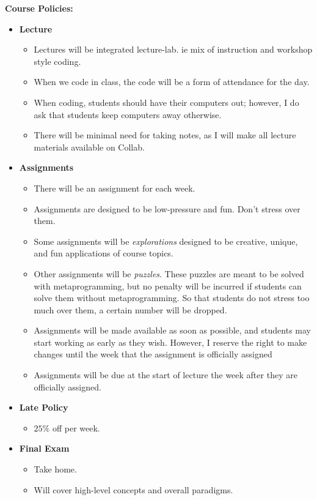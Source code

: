 \documentclass[11pt]{article}
\begin{document}
\textbf {\large Course Policies:}
\begin{itemize}
	\item \textbf {Lecture}
		\begin{itemize}
			\item Lectures will be integrated lecture-lab. ie mix of instruction and workshop style coding. 
			\item When we code in class, the code will be a form of attendance for the day.
			\item When coding, students should have their computers out; however, I do ask that students keep computers away otherwise. 
			\item There will be minimal need for taking notes, as I will make all lecture materials available on Collab.
		\end{itemize}
		\item \textbf {Assignments}
		\begin{itemize}
			\item There will be an assignment for each week. 
			\item Assignments are designed to be low-pressure and fun. Don't stress over them.
			\item Some assignments will be \textit{explorations} designed to be creative, unique, and fun applications of course topics.
			\item Other assignments will be \textit{puzzles}. These puzzles are meant to be solved with metaprogramming, but no penalty will be incurred if students can solve them without metaprogramming. So that students do not stress too much over them, a certain number will be dropped.
			\item Assignments will be made available as soon as possible, and students may start working as early as they wish. However, I reserve the right to make changes until the week that the assignment is officially assigned
			\item Assignments will be due at the start of lecture the week after they are officially assigned.
		\end{itemize}
		\item \textbf {Late Policy}
		\begin{itemize}
		\item $25\%$ off per week.
		\end{itemize}
		\item \textbf {Final Exam}
		\begin{itemize}
		\item Take home.
		\item Will cover high-level concepts and overall paradigms. 
		\end{itemize}
\end{itemize}
\end{document}
